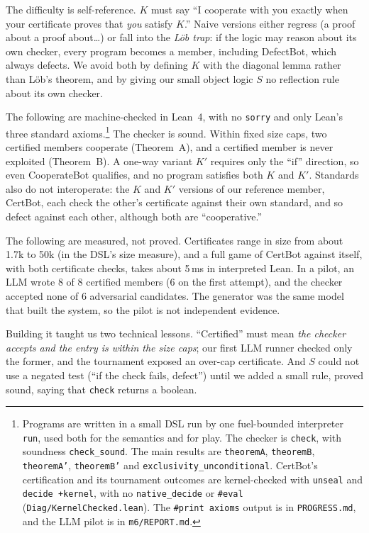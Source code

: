 \documentclass[11pt]{article}
\begin{document}
The difficulty is self-reference. $K$ must say ``I cooperate with you exactly when your certificate proves that \emph{you} satisfy $K$.'' Naive versions either regress (a proof about a proof about\ldots) or fall into the \emph{Löb trap}: if the logic may reason about its own checker, every program becomes a member, including DefectBot, which always defects. We avoid both by defining $K$ with the diagonal lemma rather than Löb's theorem, and by giving our small object logic $S$ no reflection rule about its own checker.

The following are machine-checked in Lean~4, with no \texttt{sorry} and only Lean's three standard axioms.\footnote{Programs are written in a small DSL run by one fuel-bounded interpreter \texttt{run}, used both for the semantics and for play. The checker is \texttt{check}, with soundness \texttt{check\_sound}. The main results are \texttt{theoremA}, \texttt{theoremB}, \texttt{theoremA'}, \texttt{theoremB'} and \texttt{exclusivity\_unconditional}. CertBot's certification and its tournament outcomes are kernel-checked with \texttt{unseal} and \texttt{decide +kernel}, with no \texttt{native\_decide} or \texttt{\#eval} (\texttt{Diag/KernelChecked.lean}). The \texttt{\#print axioms} output is in \texttt{PROGRESS.md}, and the LLM pilot is in \texttt{m6/REPORT.md}.} The checker is sound. Within fixed size caps, two certified members cooperate (Theorem~A), and a certified member is never exploited (Theorem~B). A one-way variant $K'$ requires only the ``if'' direction, so even CooperateBot qualifies, and no program satisfies both $K$ and $K'$. Standards also do not interoperate: the $K$ and $K'$ versions of our reference member, CertBot, each check the other's certificate against their own standard, and so defect against each other, although both are ``cooperative.''

The following are measured, not proved. Certificates range in size from about 1.7k to 50k (in the DSL's size measure), and a full game of CertBot against itself, with both certificate checks, takes about 5\,ms in interpreted Lean. In a pilot, an LLM wrote 8 of 8 certified members (6 on the first attempt), and the checker accepted none of 6 adversarial candidates. The generator was the same model that built the system, so the pilot is not independent evidence.

Building it taught us two technical lessons. ``Certified'' must mean \emph{the checker accepts and the entry is within the size caps}; our first LLM runner checked only the former, and the tournament exposed an over-cap certificate. And $S$ could not use a negated test (``if the check fails, defect'') until we added a small rule, proved sound, saying that \texttt{check} returns a boolean.
\end{document}
